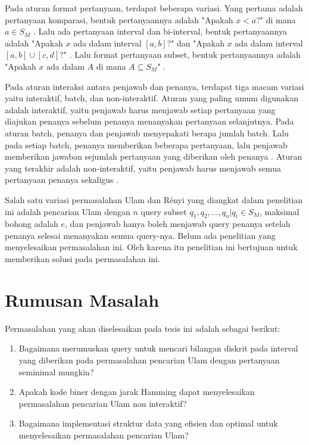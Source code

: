 Pada aturan format pertanyaan, terdapat beberapa variasi. Yang pertama adalah pertanyaan komparasi, bentuk pertanyaannya adalah "Apakah $x<a$?" di mana $a \in S_M$ \cite{Innes} \cite{Auletta1992}. Lalu ada pertanyaan interval dan bi-interval, bentuk pertanyaannya adalah "Apakah $x$ ada dalam interval $[a,b]$?" \cite{Peter2017} dan "Apakah $x$ ada dalam interval $[a,b] \cup [c,d]$?" \cite{Mundici1997}. Lalu format pertanyaan subset, bentuk pertanyaannya adalah "Apakah $x$ ada dalam $A$ di mana $A \subseteq S_M$" \cite{Katona} \cite{Macula1997}.

Pada aturan interaksi antara penjawab dan penanya, terdapat tiga macam variasi yaitu interaktif, batch, dan non-interaktif. Aturan yang paling umum digunakan adalah interaktif, yaitu penjawab harus menjawab setiap pertanyaan yang diajukan penanya sebelum penanya menanyakan pertanyaan selanjutnya. Pada aturan batch, penanya dan penjawab menyepakati berapa jumlah batch. Lalu pada setiap batch, penanya memberikan beberapa pertanyaan, lalu penjawab memberikan jawaban sejumlah pertanyaan yang diberikan oleh penanya \cite{Cicalese2000}. Aturan yang terakhir adalah non-interaktif, yaitu penjawab harus menjawab semua pertanyaan penanya sekaligus \cite{Macula1997}.

Salah satu variasi permasalahan Ulam dan Rényi yang diangkat dalam penelitian ini adalah pencarian Ulam dengan $n$ query subset ${q_1,q_2,\ldots,q_n} | q_i \in S_M$, maksimal bohong adalah $e$, dan penjawab hanya boleh menjawab query penanya setelah penanya selesai menanyakan semua query-nya. Belum ada penelitian yang menyelesaikan permasalahan ini. Oleh karena itu penelitian ini bertujuan untuk memberikan solusi pada permasalahan ini.


\section {Rumusan Masalah}
Permasalahan yang akan diselesaikan pada tesis ini adalah sebagai berikut:

\begin {enumerate}
  \item Bagaimana merumuskan query untuk mencari bilangan diskrit pada interval yang diberikan pada permasalahan pencarian Ulam dengan pertanyaan seminimal mungkin?
  \item Apakah kode biner dengan jarak Hamming dapat menyelesaikan permasalahan pencarian Ulam non interaktif?
  \item Bagaimana implementasi struktur data yang efisien dan optimal untuk menyelesaikan permasalahan pencarian Ulam?
\end {enumerate}


